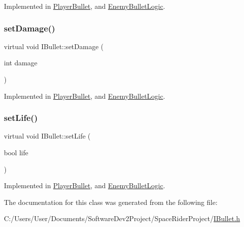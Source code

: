 Implemented in \hyperlink{class_player_bullet_a8469319697d70e04399d8aaac3902c80}{Player\+Bullet}, and \hyperlink{class_enemy_bullet_logic_aaa5273b969347ce8c6e62261ccc3df3a}{Enemy\+Bullet\+Logic}.

\mbox{\label{class_i_bullet_a072298555accb47f11b84f4c781ae876}} 
\subsubsection{\texorpdfstring{set\+Damage()}{setDamage()}}
{\footnotesize\ttfamily virtual void I\+Bullet\+::set\+Damage (\begin{DoxyParamCaption}\item[{int}]{damage }\end{DoxyParamCaption})\hspace{0.3cm}{\ttfamily [pure virtual]}}



Implemented in \hyperlink{class_player_bullet_a09347ab7665742fc7d492fe26c3a6bce}{Player\+Bullet}, and \hyperlink{class_enemy_bullet_logic_a3e4ce40e06e9fa23826bd74015fd75f2}{Enemy\+Bullet\+Logic}.

\mbox{\label{class_i_bullet_abf99befdaa121e7c9ca2acc2ed75b513}} 
\subsubsection{\texorpdfstring{set\+Life()}{setLife()}}
{\footnotesize\ttfamily virtual void I\+Bullet\+::set\+Life (\begin{DoxyParamCaption}\item[{bool}]{life }\end{DoxyParamCaption})\hspace{0.3cm}{\ttfamily [pure virtual]}}



Implemented in \hyperlink{class_player_bullet_af713549c4bb9a2400a7929564f5b81ff}{Player\+Bullet}, and \hyperlink{class_enemy_bullet_logic_a92e4dfb6a528114ad58f9ae64924fbab}{Enemy\+Bullet\+Logic}.



The documentation for this class was generated from the following file\+:\begin{DoxyCompactItemize}
\item 
C\+:/\+Users/\+User/\+Documents/\+Software\+Dev2\+Project/\+Space\+Rider\+Project/\hyperlink{_i_bullet_8h}{I\+Bullet.\+h}\end{DoxyCompactItemize}
